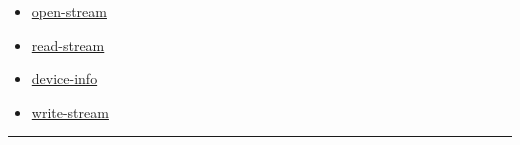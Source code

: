 \documentclass[a4paper]{report}
\begin{document}
\begin{defun}[Function]
	
    \begin{itemize}
    
	  
    \item
    \hyperref[portaudio__fun__open-stream]{open-stream}
    
    \item
    \hyperref[portaudio__fun__read-stream]{read-stream}
    
    \item
    \hyperref[portaudio__class__device-info]{device-info}
    
    \item
    \hyperref[portaudio__fun__write-stream]{write-stream}
    
	
    \end{itemize}
  
      


    
    \end{defun}
  
  

    \rule{\linewidth}{0.1mm}
    
\end{document}
